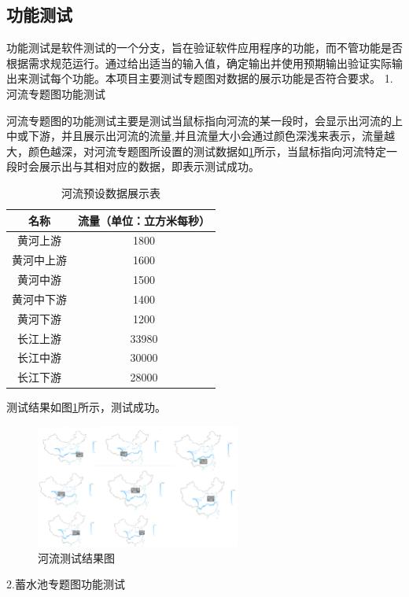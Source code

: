 \subsection{功能测试}
功能测试是软件测试的一个分支，旨在验证软件应用程序的功能，而不管功能是否根据需求规范运行。通过给出适当的输入值，确定输出并使用预期输出验证实际输出来测试每个功能。本项目主要测试专题图对数据的展示功能是否符合要求。
1.河流专题图功能测试

河流专题图的功能测试主要是测试当鼠标指向河流的某一段时，会显示出河流的上中或下游，并且展示出河流的流量,并且流量大小会通过颜色深浅来表示，流量越大，颜色越深，对河流专题图所设置的测试数据如\ref{heliu}所示，当鼠标指向河流特定一段时会展示出与其相对应的数据，即表示测试成功。
\begin{table}[H]
	\centering
	\caption[河流数据]{河流预设数据展示表}
	\label{heliu}
	\begin{tabular}{cc}
		\toprule
		名称           & 流量（单位：立方米每秒）     \\
		\midrule
		黄河上游         & 1800 \\
		黄河中上游     & 1600   \\
		黄河中游      & 1500      \\
		黄河中下游      & 1400    \\
		黄河下游 & 1200      \\
		长江上游 & 33980      \\
		长江中游       & 30000    \\
		长江下游  & 28000      \\
		\bottomrule
	\end{tabular}
\end{table}
测试结果如图\ref{fig:ceshiheliu}所示，测试成功。
\begin{figure}[!htb]%
	\centering
	\includegraphics[width=0.60\textwidth]{figs/ceshiheliu.png}
	\caption{河流测试结果图}
	\label{fig:ceshiheliu}
\end{figure}

2.蓄水池专题图功能测试

